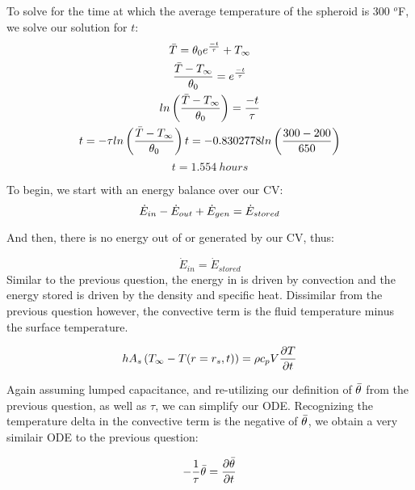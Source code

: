 \documentclass{article}
\begin{document}
To solve for the time at which the average temperature of the spheroid is 300 $^o$F, we solve our solution for $t$:
\begin{equation}
    \begin{gathered}
        \Bar{T} = \theta_0 e^{\frac{-t}{\tau}} + T_{\infty} \\
        \frac{\Bar{T} - T_{\infty}}{\theta_0} = e^{\frac{-t}{\tau}} \\
        ln\left(\frac{\Bar{T} - T_{\infty}}{\theta_0}\right) = \frac{-t}{\tau} \\
        t = -\tau ln\left(\frac{\Bar{T} - T_{\infty}}{\theta_0}\right)
        t = - 0.8302778 ln\left(\frac{300 - 200}{650}\right)
    \end{gathered}
\end{equation}
\[
\boxed{t = 1.554 \ hours}
\]











To begin, we start with an energy balance over our CV:
\begin{equation}
    \Dot{E}_{in} - \Dot{E}_{out} + \Dot{E}_{gen} = \Dot{E}_{stored}
\end{equation}

And then, there is no energy out of or generated by our CV, thus:

\begin{equation}
    \Dot{E}_{in} = \Dot{E}_{stored}
\end{equation}
Similar to the previous question, the energy in is driven by convection and the energy stored is driven by the density and specific heat. Dissimilar from the previous question however, the convective term is the fluid temperature minus the surface temperature.

\begin{equation}
    h A_s\left(T_{\infty} - T(r = r_s, t)\right) = \rho c_p V \frac{\partial T}{\partial t}
\end{equation}

Again assuming lumped capacitance, and re-utilizing our definition of $\Bar{\theta}$ from the previous question, as well as $\tau$, we can simplify our ODE. Recognizing the temperature delta in the convective term is the negative of $\Bar{\theta}$, we obtain a very similair ODE to the previous question:

\begin{equation}
    -\frac{1}{\tau} \Bar{\theta} = \frac{\partial \Bar{\theta}}{\partial t}
\end{equation}
\end{document}
